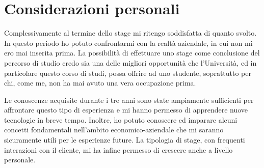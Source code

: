 \section{Considerazioni personali}
Complessivamente al termine dello stage mi ritengo soddisfatta di quanto svolto. In questo periodo ho potuto confrontarmi con la realtà aziendale, in cui non mi ero mai inserita prima. La possibilità di effettuare uno stage come conclusione del percorso di studio credo sia una delle migliori opportunità che l'Università, ed in particolare questo corso di studi, possa offrire ad uno studente, soprattutto per chi, come me, non ha mai avuto una vera occupazione prima. 

Le conoscenze acquisite durante i tre anni sono state ampiamente sufficienti per affrontare questo tipo di esperienza e mi hanno permesso di apprendere nuove tecnologie in breve tempo. Inoltre, ho potuto conoscere ed imparare alcuni concetti fondamentali nell'ambito economico-aziendale che mi saranno sicuramente utili per le esperienze future. La tipologia di stage, con frequenti interazioni con il cliente, mi ha infine permesso di crescere anche a livello personale.
